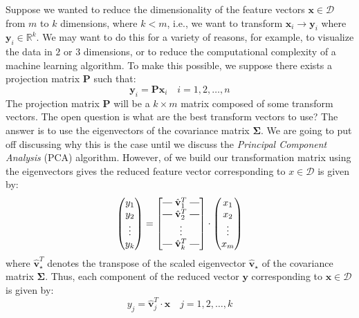 \documentclass{article}[11pt]
\makeatletter
\newcommand{\brows}[1]{%
  \begin{bmatrix}
  \begin{array}{@{\protect\rotvert\;}c@{\;\protect\rotvert}}
  #1
  \end{array}
  \end{bmatrix}
}
\newcommand{\rotvert}{\rotatebox[origin=c]{90}{$\vert$}}
\newcommand{\rowsvdots}{\multicolumn{1}{@{}c@{}}{\vdots}}
\def\D{\mathcal{D}}
\makeatother
\begin{document}
Suppose we wanted to reduce the dimensionality of the feature vectors $\mathbf{x}\in\D$ from $m$ to $k$ dimensions, where $k<m$, 
i.e., we want to transform $\mathbf{x}_{i}\rightarrow\mathbf{y}_{i}$ where $\mathbf{y}_{i}\in\mathbb{R}^{k}$. 
We may want to do this for a variety of reasons, for example, to visualize the data in $2$ or $3$ dimensions, or to reduce the computational complexity of a machine learning algorithm.
To make this possible, we suppose there exists a projection matrix $\mathbf{P}$ such that:
\begin{equation}
   \mathbf{y}_{i} = \mathbf{P}\mathbf{x}_{i}\quad{i=1,2,\dots,n}
\end{equation}
The projection matrix $\mathbf{P}$ will be a $k\times{m}$ matrix composed of some transform vectors. The open question is 
what are the best transform vectors to use? The answer is to use the eigenvectors of the covariance matrix $\mathbf{\Sigma}$.
We are going to put off discussing why this is the case until we discuss the \emph{Principal Component Analysis} (PCA) algorithm.
However, of we build our transformation matrix using the eigenvectors gives the reduced feature vector corresponding to $x\in\D$ is given by:
\begin{equation}
   \begin{pmatrix}
      y_{1} \\
      y_{2} \\
      \vdots \\
      y_{k}
   \end{pmatrix} = \brows{\hat{\mathbf{v}}_1^T \\ \hat{\mathbf{v}}_2^T \\ \rowsvdots \\ \hat{\mathbf{v}}_k^T}
   \cdot
   \begin{pmatrix}
      x_{1} \\
      x_{2} \\
      \vdots \\
      x_{m}
   \end{pmatrix}
\end{equation}
where $\hat{\mathbf{v}}_{\star}^{T}$ denotes the transpose of the scaled eigenvector $\hat{\mathbf{v}}_{\star}$ of the covariance matrix $\mathbf{\Sigma}$.
Thus, each component of the reduced vector $\mathbf{y}$ corresponding to $\mathbf{x}\in\D$ is given by:
\begin{equation}
   y_{j} = \hat{\mathbf{v}}_{j}^{T}\cdot\mathbf{x}\quad{j=1,2,\dots,k}
\end{equation}
\end{document}
